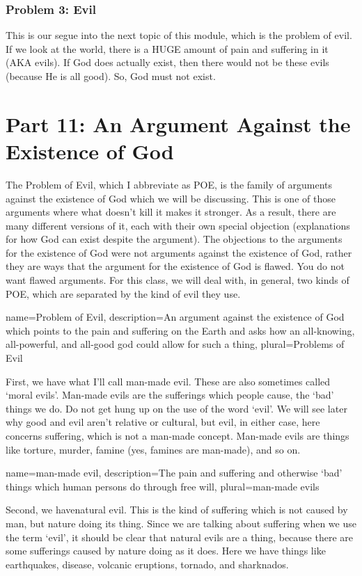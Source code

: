 \subsection{Problem 3: Evil}
This is our segue into the next topic of this module, which is the problem of evil. If we look at the world, there is a HUGE amount of pain and suffering in it (AKA evils). If God does actually exist, then there would not be these evils (because He is all good). So, God must not exist. 

\chapter{Part 11: An Argument Against the Existence of God}

The \gls{Problem of Evil}, which I abbreviate as POE, is the family of arguments against the existence of God which we will be discussing. This is one of those arguments where what doesn't kill it makes it stronger. As a result, there are many different versions of it, each with their own special objection (explanations for how God can exist despite the argument). The objections to the arguments for the existence of God were not arguments against the existence of God, rather they are ways that the argument for the existence of God is flawed. You do not want flawed arguments. For this class, we will deal with, in general, two kinds of POE, which are separated by the kind of evil they use. 

{
name=Problem of Evil,
description={An argument against the existence of God which points to the pain and suffering on the Earth and asks how an all-knowing, all-powerful, and all-good god could allow for such a thing},
plural=Problems of Evil
}


First, we have what I'll call \gls{man-made evil}. These are also sometimes called `moral evils'. Man-made evils are the sufferings which people cause, the `bad' things we do. Do not get hung up on the use of the word `evil'. We will see later why good and evil aren't relative or cultural, but evil, in either case, here concerns suffering, which is not a man-made concept. Man-made evils are things like torture, murder, famine (yes, famines are man-made), and so on. 

{
name=man-made evil,
description={The pain and suffering and otherwise `bad' things which human persons do through free will},
plural=man-made evils
}


Second, we have\gls{natural evil}. This is the kind of suffering which is not caused by man, but nature doing its thing. Since we are talking about suffering when we use the term `evil', it should be clear that natural evils are a thing, because there are some sufferings caused by nature doing as it does. Here we have things like earthquakes, disease, volcanic eruptions, tornado, and sharknados. 

